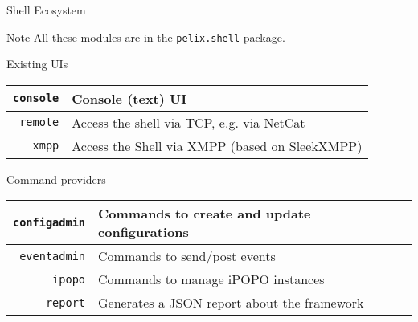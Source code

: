 \begin{frame}{Shell Ecosystem}
\begin{small}
\begin{exampleblock}{Note}
All these modules are in the \texttt{pelix.shell} package.
\end{exampleblock}

\begin{block}{Existing UIs}
\centering
\begin{tabular}{rl}
\texttt{console} & Console (text) UI \\
\hline
\texttt{remote} & Access the shell via TCP, e.g. via NetCat \\
\hline
\texttt{xmpp} & Access the Shell via XMPP (based on SleekXMPP) \\
\end{tabular}
\end{block}

\begin{block}{Command providers}
\centering
\begin{tabular}{rl}
\texttt{configadmin} & Commands to create and update configurations \\
\hline
\texttt{eventadmin} & Commands to send/post events \\
\hline
\texttt{ipopo} & Commands to manage iPOPO instances \\
\hline
\texttt{report} & Generates a JSON report about the framework \\
\end{tabular}
\end{block}
\end{small}
\end{frame}
